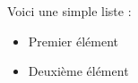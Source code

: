 \documentclass{article}
\begin{document}
Voici une simple liste :

\begin{itemize}
  \item Premier élément
  \item Deuxième élément
\end{itemize}
\end{document}
